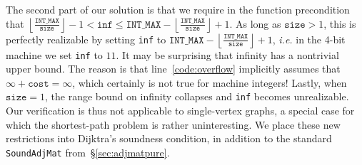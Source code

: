 The second part of our solution is that we require in the function precondition that $\left\lfloor \frac{\texttt{INT\_MAX}}{\texttt{size}} \right\rfloor - 1 < \texttt{inf} \le \texttt{INT\_MAX} - \left\lfloor \frac{\texttt{INT\_MAX}}{\texttt{size}} \right\rfloor + 1$.  As long as $\texttt{size} > 1$, this is perfectly realizable  by setting \texttt{inf} to $\texttt{INT\_MAX} - \left\lfloor \frac{\texttt{INT\_MAX}}{\texttt{size}} \right\rfloor + 1$, \emph{i.e.} in the 4-bit machine we set \texttt{inf} to $11$.  It may be surprising that infinity has a nontrivial upper bound.  The reason is that line~\ref{code:overflow} implicitly assumes that $\infty + \texttt{cost} = \infty$, which certainly is not true for machine integers!
Lastly, when $\texttt{size} = 1$, the range bound on infinity collapses and \texttt{inf} becomes unrealizable.
Our verification is thus not applicable to single-vertex graphs, a special case for which the shortest-path problem is rather uninteresting. We place these new
restrictions into Dijktra's soundness condition, in addition to the standard
\texttt{SoundAdjMat} from~\S\ref{sec:adjmatpure}.

